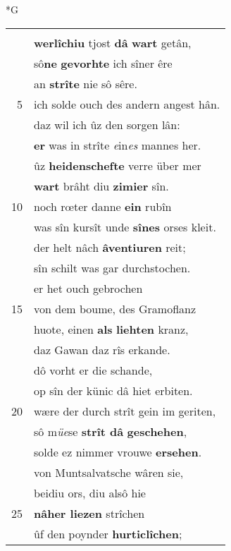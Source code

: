\documentclass[8pt,a4paper,notitlepage]{article}
\begin{document}
\newpage
\begin{table}[ht]
\begin{minipage}[t]{0.5\linewidth}
\small
\begin{center}*G
\end{center}
\begin{tabular}{rl}
 & \textbf{\begin{large}O\end{large}be} von dem werden Gawan\\ 
 & \textbf{werlîchiu} tjost \textbf{dâ} \textbf{wart} getân,\\ 
 & sô\textbf{ne} \textbf{gevorhte} ich sîner êre\\ 
 & an \textbf{strîte} nie sô sêre.\\ 
5 & ich solde ouch des andern angest hân.\\ 
 & daz wil ich ûz den sorgen lân:\\ 
 & \textbf{er} was in strîte \textit{e}in\textit{es} mannes her.\\ 
 & ûz \textbf{heidenschefte} verre über mer\\ 
 & \textbf{wart} brâht diu \textbf{zimier} sîn.\\ 
10 & noch rœter danne \textbf{ein} rubîn\\ 
 & was sîn kursît unde \textbf{sînes} orses kleit.\\ 
 & der helt nâch \textbf{âventiuren} reit;\\ 
 & sîn schilt was gar durchstochen.\\ 
 & er het ouch gebrochen\\ 
15 & von dem boume, des Gramoflanz\\ 
 & huote, einen \textbf{als} \textbf{liehten} kranz,\\ 
 & daz Gawan daz rîs erkande.\\ 
 & dô vorht er die schande,\\ 
 & op sîn der künic dâ hiet erbiten.\\ 
20 & wære der durch strît gein im geriten,\\ 
 & sô m\textit{üe}se \textbf{strît dâ} \textbf{geschehen},\\ 
 & solde ez nimmer vrouwe \textbf{ersehen}.\\ 
 & von Muntsalvatsche  wâren sie,\\ 
 & beidiu ors, diu alsô hie\\ 
25 & \textbf{nâher liezen} strîchen\\ 
 & ûf den poynder \textbf{hurticlîchen};\\ 

\end{tabular}
\end{minipage}
\end{table}
\end{document}
